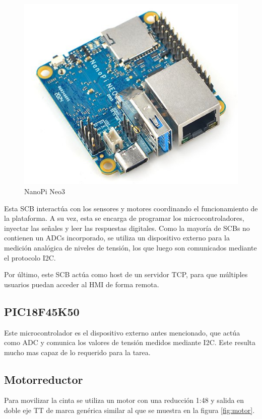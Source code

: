 \documentclass[12pt,letterpaper]{article}     %
\begin{document}
\begin{figure}[!ht]
\centering
\includegraphics[scale=0.5]{imagenes/naopi.jpg}
\caption{NanoPi Neo3}
\label{fig:nanopi}
\end{figure}

Esta SCB interactúa con los sensores y motores coordinando el funcionamiento de la plataforma.
A su vez, esta se encarga de programar los microcontroladores, inyectar las señales y leer 
las respuestas digitales. Como la mayoría de SCBs no contienen un ADCs incorporado, se utiliza
un dispositivo externo para la medición analógica de niveles de tensión, los que luego son
comunicados mediante el protocolo I2C.

Por último, este SCB actúa como host de un servidor TCP, para que múltiples usuarios puedan acceder
al HMI de forma remota.

\subsection{PIC18F45K50}

Este microcontrolador es el dispositivo externo antes mencionado, que actúa como ADC y comunica los
valores de tensión medidos mediante I2C. Este resulta mucho mas capaz de lo requerido para la tarea.

\subsection{Motorreductor}

Para movilizar la cinta se utiliza un motor con una reducción 1:48 y salida en doble eje TT de marca
genérica similar al que se muestra en la figura \ref{fig:motor}.
\end{document}
